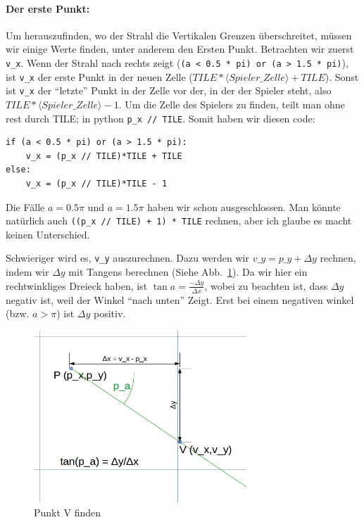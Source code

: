 \documentclass[a4paper,12pt]{report}
\begin{document}
\paragraph{Der erste Punkt:}
Um herauszufinden, wo der Strahl die Vertikalen Grenzen überschreitet, müssen wir einige Werte finden, unter anderem den Ersten Punkt. Betrachten wir zuerst \texttt{v\_x}. Wenn der Strahl nach rechts zeigt (\texttt{(a < 0.5 * pi) or (a > 1.5 * pi)}), ist \texttt{v\_x} der erste Punkt in der neuen Zelle ($TILE*\langle Spieler\_Zelle\rangle + TILE$). Sonst ist \texttt{v\_x} der ``letzte'' Punkt in der Zelle vor der, in der der Spieler steht, also $TILE*\langle Spieler\_Zelle\rangle - 1$. Um die Zelle des Spielers zu finden, teilt man ohne rest durch TILE; in python \texttt{p\_x // TILE}. Somit haben wir diesen code:
\begin{Verbatim}[baselinestretch=1.0, xleftmargin=1cm]
if (a < 0.5 * pi) or (a > 1.5 * pi):
	v_x = (p_x // TILE)*TILE + TILE
else:
	v_x = (p_x // TILE)*TILE - 1
\end{Verbatim}

Die Fälle $a = 0.5\pi$ und $a = 1.5\pi$ haben wir schon ausgeschlossen. Man könnte natürlich auch \texttt{((p\_x // TILE) + 1) * TILE} rechnen, aber ich glaube es macht keinen Unterschied.

Schwieriger wird es, \texttt{v\_y} auszurechnen. Dazu werden wir $v\_y = p\_y + \Delta y$ rechnen, indem wir $\Delta y$ mit Tangens berechnen (Siehe Abb.~\ref{fig:vcheck1}). Da wir hier ein rechtwinkliges Dreieck haben, ist $\tan a = \frac{-\Delta y}{\Delta x}$, wobei zu beachten ist, dass $\Delta y$ negativ ist, weil der Winkel ``nach unten'' Zeigt.
Erst bei einem negativen winkel (bzw. $a > \pi$) ist $\Delta y$ positiv.

\begin{figure}[htbp] 
        \centering
        \includegraphics[width=8cm]{vcheck1.png} 
        \caption{Punkt V finden}
        \label{fig:vcheck1}
\end{figure}
\end{document}
